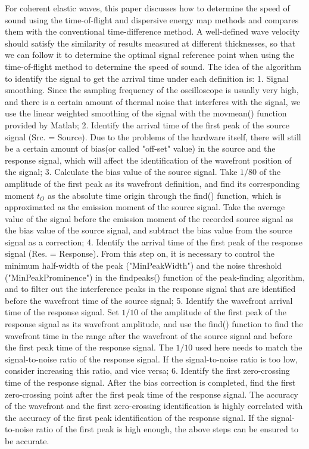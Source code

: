\begin{digest}
    For coherent elastic waves, this paper discusses how to determine the speed of sound using the time-of-flight and dispersive energy map methods and compares them with the conventional time-difference method. A well-defined wave velocity should satisfy the similarity of results measured at different thicknesses, so that we can follow it to determine the optimal signal reference point when using the time-of-flight method to determine the speed of sound. The idea of the algorithm to identify the signal to get the arrival time under each definition is:
    1. Signal smoothing. Since the sampling frequency of the oscilloscope is usually very high, and there is a certain amount of thermal noise that interferes with the signal, we use the linear weighted smoothing of the signal with the movmean() function provided by Matlab;
    2. Identify the arrival time of the first peak of the source signal (Src. = Source). Due to the problems of the hardware itself, there will still be a certain amount of bias(or called "off-set" value) in the source and the response signal, which will affect the identification of the wavefront position of the signal;
    3. Calculate the bias value of the source signal. Take $1/80$ of the amplitude of the first peak as its wavefront definition, and find its corresponding moment $t_{O}$ as the absolute time origin through the find() function, which is approximated as the emission moment of the source signal. Take the average value of the signal before the emission moment of the recorded source signal as the bias value of the source signal, and subtract the bias value from the source signal as a correction; 
    4. Identify the arrival time of the first peak of the response signal (Res. = Response). From this step on, it is necessary to control the minimum half-width of the peak ("MinPeakWidth") and the noise threshold ("MinPeakProminence") in the findpeaks() function of the peak-finding algorithm, and to filter out the interference peaks in the response signal that are identified before the wavefront time of the source signal;
    5. Identify the wavefront arrival time of the response signal. Set $1/10$ of the amplitude of the first peak of the response signal as its wavefront amplitude, and use the find() function to find the wavefront time in the range after the wavefront of the source signal and before the first peak time of the response signal. The $1/10$ used here needs to match the signal-to-noise ratio of the response signal. If the signal-to-noise ratio is too low, consider increasing this ratio, and vice versa;
    6. Identify the first zero-crossing time of the response signal. After the bias correction is completed, find the first zero-crossing point after the first peak time of the response signal. The accuracy of the wavefront and the first zero-crossing identification is highly correlated with the accuracy of the first peak identification of the response signal. If the signal-to-noise ratio of the first peak is high enough, the above steps can be ensured to be accurate.


\end{digest}
